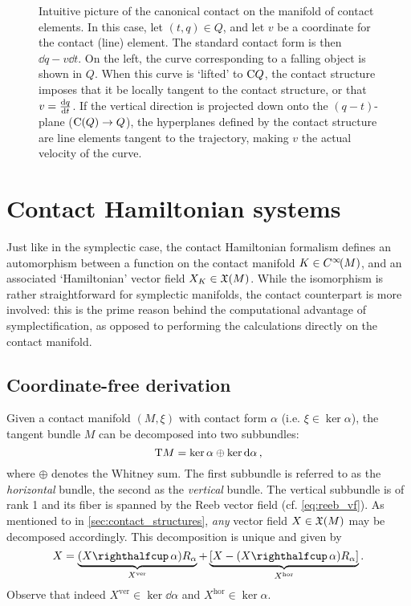 \begin{figure}[h!]
    \centering
    
    \caption{Intuitive picture of the canonical contact on the manifold of contact elements. In this case, let \( (t, q) \in Q\), and let \(v\) be a coordinate for the contact (line) element. The standard contact form is then \(\dd{q} - v\dd{t}\). On the left, the curve corresponding to a falling object is shown in \(Q\). When this curve is `lifted' to \(\mathrm{C}Q\), the contact structure imposes that it be locally tangent to the contact structure, or that \(v = \dv{q}{t}\). If the vertical direction is projected down onto the \((q-t)\)-plane (\(\mathrm{C}(Q) \to Q\)), the hyperplanes defined by the contact structure are line elements tangent to the trajectory, making \(v\) the actual velocity of the curve.}
    \label{fig:contact_lift}
\end{figure}

\section{Contact Hamiltonian systems}
\label{sec:contact_ham_systems}

\label{ssec:contact_ham_vfields}
Just like in the symplectic case, the contact Hamiltonian formalism defines an automorphism between a function on the contact manifold \(K \in C^\infty\!\qty(M)\), and an associated `Hamiltonian' vector field \(X_K \in \mathfrak{X}\qty(M)\). While the isomorphism is rather straightforward for symplectic manifolds, the contact counterpart is more involved: this is the prime reason behind the computational advantage of symplectification, as opposed to performing the calculations directly on the contact manifold.

\subsection*{Coordinate-free derivation} Given a contact manifold \((M, \xi)\) with contact form \(\alpha\) (i.e. \(\xi \in \ker \alpha\)), the tangent bundle \(M\) can be decomposed into two subbundles: \cite{Libermann1987,Cannas2001}
\begin{equation}
     \mathrm{T}M = \ker \alpha \oplus \ker \dd{\alpha},
\end{equation}
where \(\oplus\) denotes the Whitney sum. The first subbundle is referred to as the \emph{horizontal} bundle, the second as the \emph{vertical}
 bundle. The vertical subbundle is of rank 1 and its fiber is spanned by the Reeb vector field (cf. \cref{eq:reeb_vf}). As mentioned to in \cref{sec:contact_structures}, \emph{any} vector field \(X \in \mathfrak{X}\qty(M)\) may be decomposed accordingly. This decomposition is unique and given by
\begin{equation}
    X = \underbrace{(\intpr{X}{\alpha})R_\alpha}_{X^\text{ver}} + \underbrace{\qty[X - (\intpr{X}{\alpha})R_\alpha]}_{X^\text{hor}}.
    \label{eq:contact_vf_decomp}
\end{equation}
Observe that indeed \(X^\text{ver} \in \ker \dd{\alpha}\) and \(X^\text{hor} \in \ker \alpha\). \cite{Cannas2001,DeLeon2020,Libermann1987}

